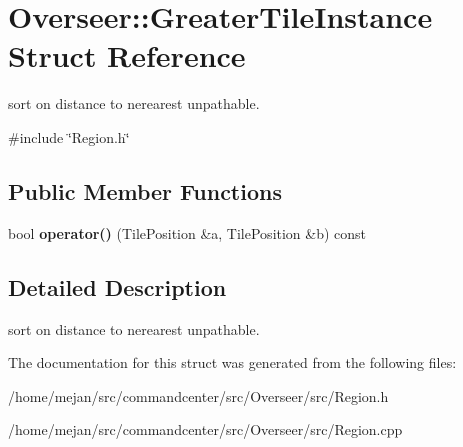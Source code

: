 \hypertarget{structOverseer_1_1GreaterTileInstance}{}\section{Overseer\+:\+:Greater\+Tile\+Instance Struct Reference}
\label{structOverseer_1_1GreaterTileInstance}


sort on distance to nerearest unpathable.  




{\ttfamily \#include \char`\"{}Region.\+h\char`\"{}}

\subsection*{Public Member Functions}
\begin{DoxyCompactItemize}
\item 
bool {\bfseries operator()} (Tile\+Position \&a, Tile\+Position \&b) const \hypertarget{structOverseer_1_1GreaterTileInstance_ad2cc6e19a01f100bb441ac1044b9147c}{}\label{structOverseer_1_1GreaterTileInstance_ad2cc6e19a01f100bb441ac1044b9147c}

\end{DoxyCompactItemize}


\subsection{Detailed Description}
sort on distance to nerearest unpathable. 

The documentation for this struct was generated from the following files\+:\begin{DoxyCompactItemize}
\item 
/home/mejan/src/commandcenter/src/\+Overseer/src/Region.\+h\item 
/home/mejan/src/commandcenter/src/\+Overseer/src/Region.\+cpp\end{DoxyCompactItemize}
